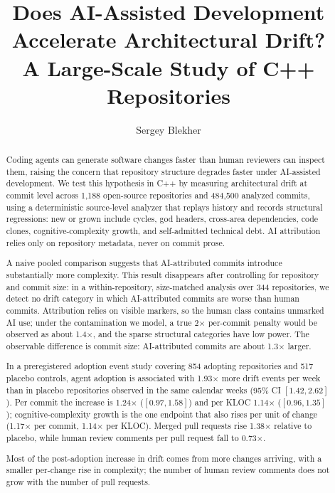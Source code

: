 \documentclass[sigplan,11pt,nonacm=true]{acmart}
\newcommand{\x}{$\times$}
\begin{document}
\title{Does AI-Assisted Development Accelerate Architectural Drift?\\
A Large-Scale Study of C++ Repositories}

\author{Sergey Blekher}

\begin{abstract}
Coding agents can generate software changes faster than human reviewers can
inspect them, raising the concern that repository structure degrades faster
under AI-assisted development. We test this hypothesis in C++ by measuring
architectural drift at commit level across 1{,}188 open-source repositories and
484{,}500 analyzed commits, using a deterministic source-level analyzer that
replays history and records structural regressions: new or grown include
cycles, god headers, cross-area dependencies, code clones,
cognitive-complexity growth, and self-admitted technical debt. AI attribution
relies only on repository metadata, never on commit prose.

A naive pooled comparison suggests that AI-attributed commits introduce
substantially more complexity. This result disappears after controlling for
repository and commit size: in a within-repository, size-matched analysis over
344 repositories, we detect no drift category in which AI-attributed commits
are worse than human commits. Attribution relies on visible markers, so the
human class contains unmarked AI use; under the contamination we model, a
true 2\x{} per-commit penalty would be observed as about 1.4\x{}, and the
sparse structural categories have low power. The observable
difference is commit size: AI-attributed commits are about 1.3\x{} larger.

In a preregistered adoption event study covering 854 adopting repositories and
517 placebo controls, agent adoption is associated with 1.93\x{} more drift
events per week than in placebo repositories observed in the same calendar
weeks (95\% CI $[1.42, 2.62]$). Per commit the increase is 1.24\x{}
($[0.97, 1.58]$) and per KLOC 1.14\x{} ($[0.96, 1.35]$); cognitive-complexity
growth is the one endpoint that also rises per unit of change (1.17\x{} per
commit, 1.14\x{} per KLOC). Merged pull requests rise 1.38\x{} relative to
placebo, while human review comments per pull request fall to 0.73\x{}.

Most of the post-adoption increase in drift comes from more changes arriving,
with a smaller per-change rise in complexity; the number of human review
comments does not grow with the number of pull requests.
\end{abstract}
\end{document}
